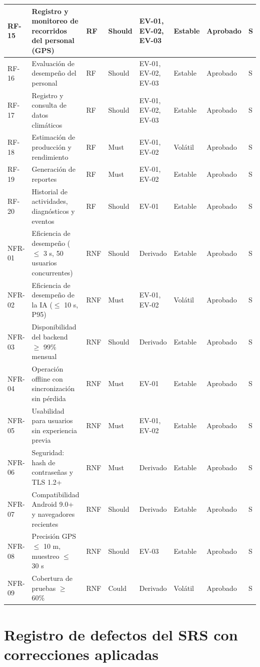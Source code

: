 \documentclass[11pt,a4paper]{report}
\begin{document}
\begin{longtable}{|
p{1.2cm}|
p{4.4cm}|
p{0.8cm}|
p{1.7cm}|
p{1.3cm}|
p{2cm}|
p{1.5cm}|
p{0.8cm}|}
RF-15 & Registro y monitoreo de recorridos del personal (GPS) & RF & Should & EV-01, EV-02, EV-03 & Estable & Aprobado & S \\ \hline
RF-16 & Evaluación de desempeño del personal & RF & Should & EV-01, EV-02, EV-03 & Estable & Aprobado & S \\ \hline
RF-17 & Registro y consulta de datos climáticos & RF & Should & EV-01, EV-02, EV-03 & Estable & Aprobado & S \\ \hline
RF-18 & Estimación de producción y rendimiento & RF & Must & EV-01, EV-02 & Volátil & Aprobado & S \\ \hline
RF-19 & Generación de reportes & RF & Must & EV-01, EV-02 & Estable & Aprobado & S \\ \hline
RF-20 & Historial de actividades, diagnósticos y eventos & RF & Should & EV-01 & Estable & Aprobado & S \\ \hline
NFR-01 & Eficiencia de desempeño ($\leq$ 3 s, 50 usuarios concurrentes) & RNF & Should & Derivado & Estable & Aprobado & S \\ \hline
NFR-02 & Eficiencia de desempeño de la IA ($\leq$ 10 s, P95) & RNF & Must & EV-01, EV-02 & Volátil & Aprobado & S \\ \hline
NFR-03 & Disponibilidad del backend $\geq$ 99\% mensual & RNF & Should & Derivado & Estable & Aprobado & S \\ \hline
NFR-04 & Operación offline con sincronización sin pérdida & RNF & Must & EV-01 & Estable & Aprobado & S \\ \hline
NFR-05 & Usabilidad para usuarios sin experiencia previa & RNF & Must & EV-01, EV-02 & Estable & Aprobado & S \\ \hline
NFR-06 & Seguridad: hash de contraseñas y TLS 1.2+ & RNF & Must & Derivado & Estable & Aprobado & S \\ \hline
NFR-07 & Compatibilidad Android 9.0+ y navegadores recientes & RNF & Should & Derivado & Estable & Aprobado & S \\ \hline
NFR-08 & Precisión GPS $\leq$ 10 m, muestreo $\leq$ 30 s & RNF & Should & EV-03 & Estable & Aprobado & S \\ \hline
NFR-09 & Cobertura de pruebas $\geq$ 60\% & RNF & Could & Derivado & Volátil & Aprobado & S \\ \hline
\end{longtable}


\chapter{Registro de defectos del SRS con correcciones aplicadas}
\end{document}

